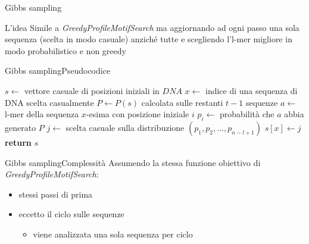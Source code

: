 	\begin{frame}{Gibbs sampling}
		\begin{block}{L'idea}
			Simile a \textit{GreedyProfileMotifSearch} ma aggiornando ad ogni passo una sola sequenza (scelta in modo casuale) anziché tutte e scegliendo l'l-mer migliore in modo  probabilistico e non greedy
		\end{block}
	\end{frame}
	
	\begin{frame}{Gibbs sampling}{Pseudocodice}
		\begin{center}
			\begin{minipage}{11.5cm}
			    \begin{algorithmic}[1]
				    	\State $s\gets$  vettore casuale di posizioni iniziali in $DNA$
				    	\Repeat
				    		\State $x\gets$ indice di una sequenza di DNA scelta casualmente
				    		\State $P\gets P(s)$ calcolata sulle restanti $t-1$ sequenze
				    			\State $a\gets$ l-mer della sequenza $x$-esima con posizione iniziale $i$
				    			\State $p_i\gets $ probabilità che $a$ abbia generato $P$
				    		\EndFor
				    		\State $j\gets$ scelta casuale sulla distribuzione $(p_1,p_2,\dots,p_{n-l+1})$
				    		\State $s[x]\gets j$
				    	\State \textbf{return} $s$
				    \EndProcedure
			    \end{algorithmic}
			\end{minipage}
	    \end{center}
	\end{frame}
	
	\begin{frame}{Gibbs sampling}{Complessità}
		Assumendo la stessa funzione obiettivo di \textit{GreedyProfileMotifSearch}:
		\begin{itemize}
			\item stessi passi di prima
			\item eccetto il ciclo sulle sequenze
			\begin{itemize}
				\item viene analizzata una sola sequenza per ciclo
			\end{itemize}
		\end{itemize}
	\end{frame}
	
